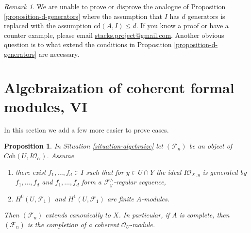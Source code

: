 \documentclass{stacks-project}
\theoremstyle{plain}
\newtheorem{proposition}[subsection]{Proposition}
\theoremstyle{definition}
\theoremstyle{remark}
\newtheorem{remark}[subsection]{Remark}
\numberwithin{equation}{subsection}
\begin{document}
\begin{remark}
\label{remark-question}
We are unable to prove or disprove the analogue of
Proposition \ref{proposition-d-generators}
where the assumption that $I$ has $d$ generators
is replaced with the assumption $\text{cd}(A, I) \leq d$.
If you know a proof or have a counter example, please email
\href{mailto:stacks.project@gmail.com}{stacks.project@gmail.com}.
Another obvious question is to what extend the conditions in
Proposition \ref{proposition-d-generators}
are necessary.
\end{remark}




\section{Algebraization of coherent formal modules, VI}
\label{section-algebraization-modules-yet-more}

\noindent
In this section we add a few more easier to prove cases.

\begin{proposition}
\label{proposition-algebraization-regular-sequence}
In Situation \ref{situation-algebraize} let
$(\mathcal{F}_n)$ be an object of $\textit{Coh}(U, I\mathcal{O}_U)$.
Assume
\begin{enumerate}
\item there exist $f_1, \ldots, f_d \in I$ such that
for $y \in U \cap Y$ the ideal $I\mathcal{O}_{X, y}$
is generated by $f_1, \ldots, f_d$ and
$f_1, \ldots, f_d$ form a $\mathcal{F}_y^\wedge$-regular sequence,
\item $H^0(U, \mathcal{F}_1)$ and $H^1(U, \mathcal{F}_1)$
are finite $A$-modules.
\end{enumerate}
Then $(\mathcal{F}_n)$ extends canonically to $X$. In particular, if $A$
is complete, then $(\mathcal{F}_n)$ is the completion of a coherent
$\mathcal{O}_U$-module.
\end{proposition}
\end{document}
